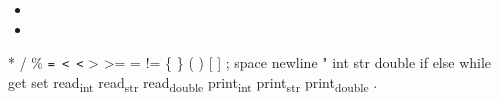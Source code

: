 \documentclass[11pt]{article}
\author{Alex Pop}
\date{\today}
\title{}
\begin{document}
\tableofcontents

\begin{itemize}
\item 

\item 
\end{itemize}
*
/
\%
\texttt{=
<
<}
>
>=
=
!=
\{
\}
(
)
[
]
;
space
newline
"
int
str
double
if
else
while
get
set
read\textsubscript{int}
read\textsubscript{str}
read\textsubscript{double}
print\textsubscript{int}
print\textsubscript{str}
print\textsubscript{double}
.
\end{document}
